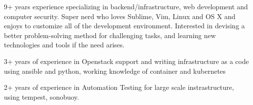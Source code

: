 

\begin{cvparagraph}

9+ years experience specializing in backend/infrastructure,
web development and computer security. Super nerd who loves Sublime, Vim,
Linux and OS X and enjoys to customize all of the development environment.
Interested in devising a better problem-solving method for challenging tasks,
and learning new technologies and tools if the need arises.

3+ years of experience in Openstack support and writing infrastructure as a code
using ansible and python, working knowledge of container and kubernetes

2+ years of experience in Automation Testing for large scale instrastructure, using 
tempest, sonobuoy.
\end{cvparagraph}


